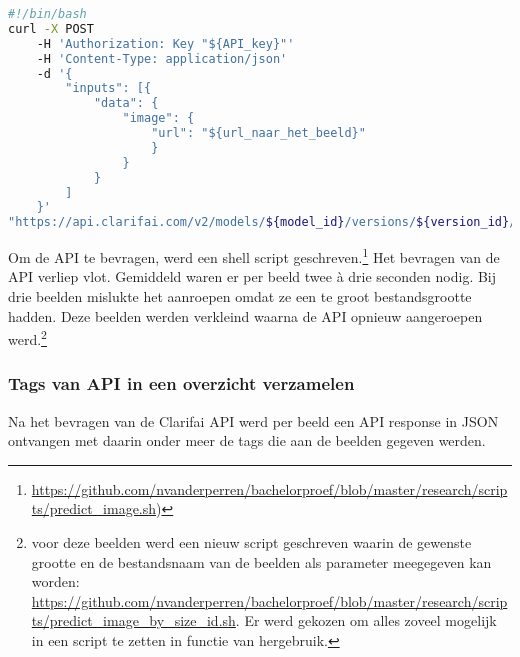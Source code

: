 
\begin{lstlisting}[language=bash,caption=bash commando om een beeld door Clarifai te laten taggen.]
#!/bin/bash
curl -X POST
    -H 'Authorization: Key "${API_key}"'
    -H 'Content-Type: application/json'
    -d '{
        "inputs": [{
            "data": {
                "image": { 
                    "url": "${url_naar_het_beeld}"
                    }
                }
            }
        ]
    }'
"https://api.clarifai.com/v2/models/${model_id}/versions/${version_id}/outputs"
\end{lstlisting}

Om de API te bevragen, werd een shell script geschreven.\footnote{\url{https://github.com/nvanderperren/bachelorproef/blob/master/research/scripts/predict_image.sh})} Het bevragen van de API verliep vlot. Gemiddeld waren er per beeld twee à drie seconden nodig. Bij drie beelden mislukte het aanroepen omdat ze een te groot bestandsgrootte hadden. Deze beelden werden verkleind waarna de API opnieuw aangeroepen werd.\footnote{voor deze beelden werd een nieuw script geschreven waarin de gewenste grootte en de bestandsnaam van de beelden als parameter meegegeven kan worden: \url{https://github.com/nvanderperren/bachelorproef/blob/master/research/scripts/predict_image_by_size_id.sh}. Er werd gekozen om alles zoveel mogelijk in een script te zetten in functie van hergebruik.}

\subsubsection{Tags van API in een overzicht verzamelen}

Na het bevragen van de Clarifai API werd per beeld een API response in JSON ontvangen met daarin onder meer de tags die aan de beelden gegeven werden.

